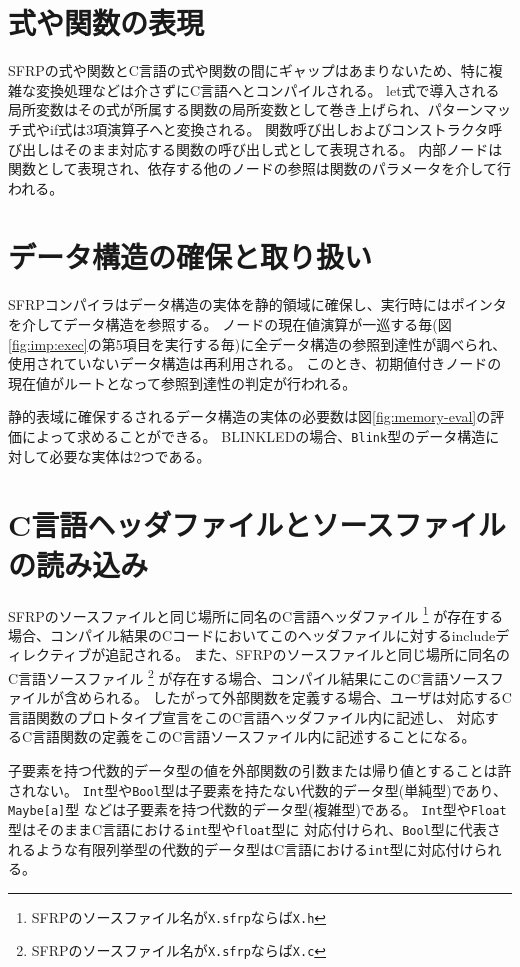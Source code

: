 \section{式や関数の表現}\label{sec:implementation:expression}
SFRPの式や関数とC言語の式や関数の間にギャップはあまりないため、特に複雑な変換処理などは介さずにC言語へとコンパイルされる。
let式で導入される局所変数はその式が所属する関数の局所変数として巻き上げられ、パターンマッチ式やif式は3項演算子へと変換される。
関数呼び出しおよびコンストラクタ呼び出しはそのまま対応する関数の呼び出し式として表現される。
内部ノードは関数として表現され、依存する他のノードの参照は関数のパラメータを介して行われる。

\section{データ構造の確保と取り扱い}\label{sec:implementation:data}
SFRPコンパイラはデータ構造の実体を静的領域に確保し、実行時にはポインタを介してデータ構造を参照する。
ノードの現在値演算が一巡する毎(図\ref{fig:imp:exec}の第5項目を実行する毎)に全データ構造の参照到達性が調べられ、使用されていないデータ構造は再利用される。
このとき、初期値付きノードの現在値がルートとなって参照到達性の判定が行われる。

静的表域に確保するされるデータ構造の実体の必要数は図\ref{fig:memory-eval}の評価によって求めることができる。
BLINKLEDの場合、\texttt{Blink}型のデータ構造に対して必要な実体は2つである。

\section{C言語ヘッダファイルとソースファイルの読み込み}
SFRPのソースファイルと同じ場所に同名のC言語ヘッダファイル
\footnote{SFRPのソースファイル名が\texttt{X.sfrp}ならば\texttt{X.h}}
が存在する場合、コンパイル結果のCコードにおいてこのヘッダファイルに対するincludeディレクティブが追記される。
また、SFRPのソースファイルと同じ場所に同名のC言語ソースファイル
\footnote{SFRPのソースファイル名が\texttt{X.sfrp}ならば\texttt{X.c}}
が存在する場合、コンパイル結果にこのC言語ソースファイルが含められる。
したがって外部関数を定義する場合、ユーザは対応するC言語関数のプロトタイプ宣言をこのC言語ヘッダファイル内に記述し、
対応するC言語関数の定義をこのC言語ソースファイル内に記述することになる。

子要素を持つ代数的データ型の値を外部関数の引数または帰り値とすることは許されない。
\texttt{Int}型や\texttt{Bool}型は子要素を持たない代数的データ型(単純型)であり、\texttt{Maybe[a]}型
などは子要素を持つ代数的データ型(複雑型)である。
\texttt{Int}型や\texttt{Float}型はそのままC言語における\texttt{int}型や\texttt{float}型に
対応付けられ、\texttt{Bool}型に代表されるような有限列挙型の代数的データ型はC言語における\texttt{int}型に対応付けられる。

